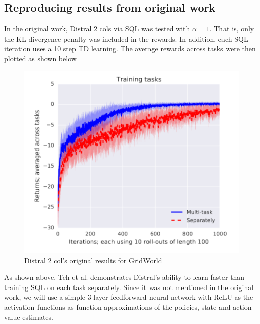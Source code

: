 \documentclass[12pt]{report}
\begin{document}
\subsection{Reproducing results from original work} \label{subsec:org-res}

In the original work, Distral 2 cols via SQL was tested with $\alpha = 1$. That is, only the KL divergence penalty was included in the rewards. In addition, each SQL iteration uses a 10 step TD learning. The average rewards across tasks were then plotted as shown below
\begin{figure}[H]
    \center
    \includegraphics[width=0.5\linewidth]{figs/Distral_paper_res.png}
    \caption{Distral 2 col's original results for GridWorld}
\end{figure}
As shown above, Teh et al. \cite{teh2017distral} demonstrates Distral's ability to learn faster than training SQL on each task separately. Since it was not mentioned in the original work, we will use a simple 3 layer feedforward neural network with ReLU as the activation functions as function approximations of the policies, state and action value estimates.\\
\end{document}
